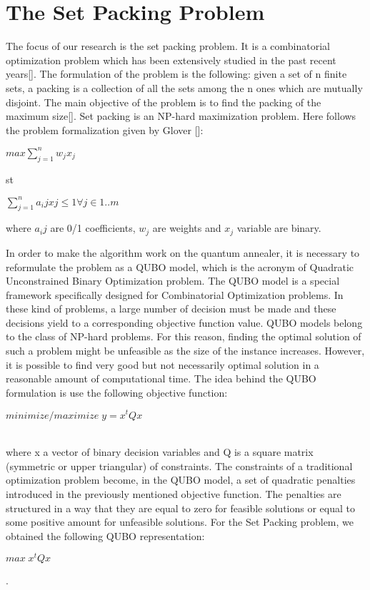 \documentclass[oneside,a4paper]{article}
\begin{document}
\section{The Set Packing Problem}


The focus of our research is the set packing problem. It is a combinatorial optimization problem which has been extensively studied in the past recent years[]. The formulation of the problem is the following: given a set of n finite sets, a packing is a collection of all the sets among the n ones which are mutually disjoint. The main objective of the problem is to find the packing of the maximum size[]. Set packing is an NP-hard maximization problem. Here follows the problem formalization given by Glover []:


\centerline{${ max {\sum_{j=1}^{n}w_jx_j}}$}
\centerline{
st
}

\centerline{${\sum_{j=1}^{n}a_ijxj \leq 1 \forall j \in 1..m}$}

\setlength\parindent{0pt}where ${a_ij}$ are 0/1 coefficients, ${w_j}$ are weights and ${x_j}$ variable are binary.



\setlength\parindent{10pt}In order to make the algorithm work on the quantum annealer, it is necessary to reformulate the problem as a QUBO model, which is the acronym of Quadratic Unconstrained Binary Optimization problem. The QUBO model is a special framework specifically designed for Combinatorial Optimization problems. In these kind of problems, a large number of decision must be made and these decisions yield to a corresponding objective function value. QUBO models belong to the class of NP-hard problems. For this reason, finding the optimal solution of such a problem might be unfeasible as the size of the instance increases. However, it is possible to find very good but not necessarily optimal solution in a reasonable amount of computational time.
The idea behind the QUBO formulation is use the following objective function:\\
\centerline{${minimize/maximize\; y = x^tQx}$}\\
where x a vector of binary decision variables and Q is a square matrix (symmetric or upper triangular) of constraints. The constraints of a traditional optimization problem become, in the QUBO model, a set of quadratic penalties introduced in the previously mentioned objective function. The penalties are structured in a way that they are equal to zero for feasible solutions or equal to some positive amount for unfeasible solutions. For the Set Packing problem, we obtained the following QUBO representation: \centerline{${max\; x^tQx}$}.
\end{document}
